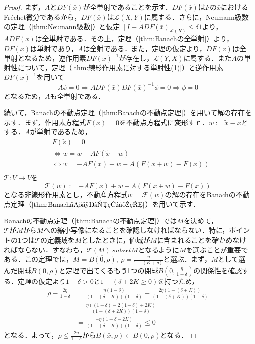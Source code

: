 \documentclass[11pt,a4paper]{jsarticle}
\theoremstyle{definition}
\begin{document}
\begin{proof}
  まず，$AとDF(\bar{x})$が全単射であることを示す．$DF(\bar{x})$は$Fの\bar{x}$におけるFr\'{e}chet微分であるから，$DF(\bar{x})$は$\mathcal{L}(X,Y)$に属する．さらに，Neumann級数の定理（\ref{thm:Neumann級数}）と仮定$\|I-ADF(\bar{x})_{\mathcal{L}(X)}\leq \delta 1$より，$ADF(\bar{x})$は全単射である．その上，定理（\ref{thm:Banachの全単射}）より，$DF(\bar{x})$は単射であり，$A$は全射である．また，定理の仮定より，$DF(\bar{x})$は全単射となるため，逆作用素$DF(\bar{x})^{-1}$が存在し，$\mathcal{L}(Y,X)$に属する．また$A$の単射性について，定理（\ref{thm:線形作用素に対する単射性(1)}）と逆作用素$DF(\bar{x})^{-1}$を用いて
  \begin{equation*}
    A\phi = 0 \Rightarrow ADF(\bar{x}) DF(\bar{x})^{-1}\phi = 0 \Rightarrow \phi = 0
  \end{equation*}
  となるため，$A$も全単射である．

  続いて，Banachの不動点定理（\ref{thm:Banachの不動点定理}）を用いて解の存在を示す．まず，作用素方程式$F(x)=0$を不動点方程式に変形すｒ．$w:=\tilde{x}-\bar{x}$とする．$A$が単射であるため，
  \begin{align*}
     & F(\tilde{x})=0                                                    \\
     & \Leftrightarrow w = w-AF(\tilde{x} + w)                           \\
     & \Leftrightarrow w = -AF(\bar{x}) + w - A(F(\bar{x}+w)-F(\bar{x})) \\
  \end{align*}
  $\mathcal{T}: V \rightarrow V$を
  \begin{equation*}
    \mathcal{T}(w) := -AF(\bar{x}) + w - A(F(\bar{x}+w)-F(\bar{x}))
  \end{equation*}
  となる非線形作用素とし，不動産方程式$w=\mathcal{F}(w)$の解の存在をBanachの不動点定理（$\ref{thm:Banachの不動点定理}$）を用いて示す．

  Banachの不動点定理（\ref{thm:Banachの不動点定理}）では$M$を決めて，$\mathcal{T}がMからMへ$の縮小写像になることを確認しなければならない．特に，ポイントの1つは$\mathcal{T}$の定義域を$M$としたときに，値域が$M$に含まれることを確かめなければならない．すなわち，$\mathcal{T}(M) \ subset M$となるように$M$を選ぶことが重要である．この定理では，$M=\overline{B(0,\rho)},\ \rho = \frac{\eta}{1-(K+\delta)}$と選ぶ．まず，$M$として選んだ閉球$\overline{B(0,\rho)}$と定理で出てくるもう1つの閉球$B\left(0, \frac{\eta}{1-\delta}\right)$の関係性を確認する．定理の仮定より$1-\delta>0$と$1-\left(\delta + 2K\geq 0\right)$を持つため，
  \begin{align*}
    \rho - \frac{2\eta}{1-\delta} & = \frac{\eta(1-\delta)}{(1-(\delta+K))(1-\delta)}-\frac{2\eta(1-(\delta +K))}{(1-(\delta+K))(1-\delta)} \\
                                  & = \frac{\eta((1-\delta)-2(1-\delta)+2K)}{(1-(\delta+2K))(1-\delta)}                                     \\
                                  & = \frac{-\eta(1-\delta-2K)}{(1-(\delta+K))(1-\delta)}
    \leq 0
  \end{align*}
  となる．よって，$\rho\leq\frac{2\eta}{1-\delta}$から$\overline{B(\bar{x},\rho)}\subset \overline{B\left(0,\rho\right)}$となる．


\end{proof}
\end{document}
